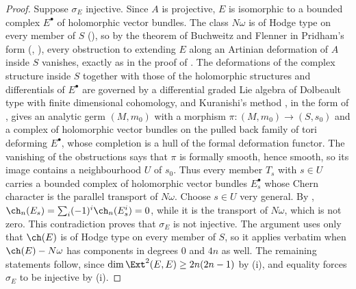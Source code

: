 \begin{proof}
Suppose $\sigma_{E}$ injective. Since $A$ is projective, $E$ is isomorphic to
a bounded complex $E^{\bullet}$ of holomorphic vector bundles. The class
$N\omega$ is of Hodge type on every member of $S$ (), so
by the theorem of Buchweitz and Flenner in Pridham's form (,
\cite{BF03,Pri24}), every obstruction to extending $E$ along an
Artinian deformation of $A$ inside $S$ vanishes, exactly as in the proof of
. The deformations of the complex structure inside
$S$ together with those of the holomorphic structures and differentials of
$E^{\bullet}$ are governed by a differential graded Lie algebra of Dolbeault
type with finite dimensional cohomology, and Kuranishi's method
\cite{Kur65}, in the form of \cite[Sections~2--3]{GM88}, gives an analytic
germ $(M,m_{0})$ with a morphism $\pi\colon(M,m_{0})\to(S,s_{0})$ and a
complex of holomorphic vector bundles on the pulled back family of tori
deforming $E^{\bullet}$, whose completion is a hull of the formal deformation
functor. The vanishing of the obstructions says that $\pi$ is formally
smooth, hence smooth, so its image contains a neighbourhood $U$ of $s_{0}$.
Thus every member $T_{s}$ with $s\in U$ carries a bounded complex of
holomorphic vector bundles $E_{s}^{\bullet}$ whose Chern character is the
parallel transport of $N\omega$. Choose $s\in U$ very general. By
,
$\ch_{n}(E_{s})=\sum_{i}(-1)^{i}\ch_{n}(E_{s}^{i})=0$, while it is the
transport of $N\omega$, which is not zero. This contradiction proves that
$\sigma_{E}$ is not injective. The argument uses only that $\ch(E)$ is of
Hodge type on every member of $S$, so it applies verbatim when $\ch(E)-N\omega$
has components in degrees $0$ and $4n$ as well. The remaining statements
follow, since $\dim\Ext^{2}(E,E)\ge2n(2n-1)$ by (i),
and equality forces $\sigma_{E}$ to be injective by
(i).
\end{proof}

